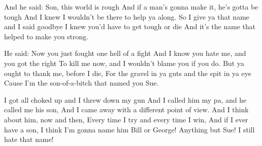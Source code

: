 \begin{guitar}
And he said: Son, this world is rough
And if a man's gonna make it, he's gotta be tough
And I knew I wouldn't be there to help ya along.
So I give ya that name and I said goodbye
I knew you'd have to get tough or die
And it's the name that helped to make you strong.

\pagebreak
He said: Now you just fought one hell of a fight
And I know you hate me, and you got the right
To kill me now, and I wouldn't blame you if you do.
But ya ought to thank me, before I die,
For the gravel in ya guts and the spit in ya eye
Cause I'm the son-of-a-bitch that named you Sue.

I got all choked up and I threw down my gun
And I called him my pa, and he called me his son,
And I came away with a different point of view.
And I think about him, now and then,
Every time I try and every time I win,
And if I ever have a son, I think I'm gonna name him
Bill or George! Anything but Sue! I still hate that name!
\end{guitar}
